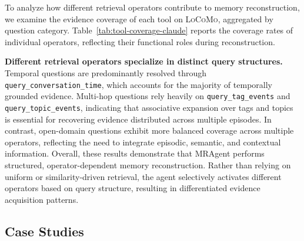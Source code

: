 To analyze how different retrieval operators contribute to memory reconstruction,
we examine the evidence coverage of each tool on \textsc{LoCoMo}, aggregated by question category.
Table~\ref{tab:tool-coverage-claude} reports the coverage rates of individual operators, reflecting their functional roles during reconstruction.

\textbf{Different retrieval operators specialize in distinct query structures.}
Temporal questions are predominantly resolved through \texttt{query\_conversation\_time}, which accounts for the majority of temporally grounded evidence.
Multi-hop questions rely heavily on \texttt{query\_tag\_events} and \texttt{query\_topic\_events}, indicating that associative expansion over tags and topics is essential for recovering evidence distributed across multiple episodes.
In contrast, open-domain questions exhibit more balanced coverage across multiple operators, reflecting the need to integrate episodic, semantic, and contextual information.
Overall, these results demonstrate that MRAgent performs structured, operator-dependent memory reconstruction.
Rather than relying on uniform or similarity-driven retrieval, the agent selectively activates different operators based on query structure, resulting in differentiated evidence acquisition patterns.




\subsection{Case Studies}
\label{app:case_study}



